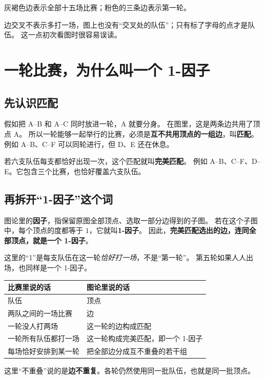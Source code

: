 \documentclass[UTF8,11pt,fontset=none]{ctexart}
\begin{document}
\begin{center}

\small 灰褐色边表示全部十五场比赛；粉色的三条边表示第一轮。
\end{center}
边交叉不表示多打一场，图上也没有“交叉处的队伍”；只有标了字母的点才是队伍。
这一点初次看图时很容易误读。

\section{一轮比赛，为什么叫一个 1-因子}
\subsection{先认识匹配}
假如把 A--B 和 A--C 同时放进一轮，A 就要分身。
在图里，这是两条边共用了顶点 A。
所以一轮能够一起举行的比赛，必须是\textbf{互不共用顶点的一组边}，叫\textbf{匹配}。
例如 A--B、C--F 可以同轮进行，但 D、E 还在休息。

若六支队伍每支都恰好出现一次，这个匹配就叫\textbf{完美匹配}。
例如 A--B、C--F、D--E。它包含三个比赛，也恰好覆盖六支队伍。

\subsection{再拆开“1-因子”这个词}
图论里的\textbf{因子}，指保留原图全部顶点、选取一部分边得到的子图。
若在这个子图中，每个顶点的度都等于 $1$，它就叫\textbf{1-因子}。
因此，\textbf{完美匹配选出的边，连同全部顶点，就是一个 1-因子}。

这里的“1”是每支队伍在这一轮\emph{恰好打一场}，不是“第一轮”。
第五轮如果人人出场，也同样是一个 1-因子。

\begin{keybox}[赛程语言与图论语言的字典]
\begin{center}
\begin{tabular}{ll}
\toprule
比赛里说的话 & 图论里说的话\\\midrule
队伍 & 顶点\\
两队之间的一场比赛 & 边\\
一轮没人打两场 & 这一轮的边构成匹配\\
一轮所有队伍都打一场 & 这一轮构成完美匹配，即一个 1-因子\\
每场恰好安排到某一轮 & 把全部边分成互不重叠的若干组\\\bottomrule
\end{tabular}
\end{center}
这里“不重叠”说的是\textbf{边不重复}。各轮仍然使用同一批队伍，也就是同一批顶点。
\end{keybox}
\end{document}
